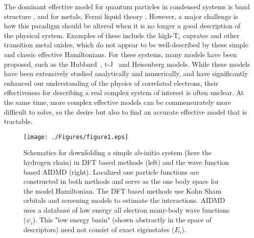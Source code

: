 The dominant effective model for quantum particles in condensed systems is band structure , and for metals, Fermi liquid theory . 
However, a major challenge is how this paradigm should be altered when it is no longer a good description of the physical system.
Examples of these include the high-T$_c$ cuprates and other transition metal oxides, which do not appear to be well-described by these simple and classic effective Hamiltonians. 
For these systems, many models have been proposed, such as the Hubbard~\cite{Hubbard}, t-J~\cite{tJSpalek} and Heisenberg models.
While these models have been extensively studied analytically and numerically, and have significantly enhanced our understanding of the physics of correlated electrons, their effectiveness for describing a real complex system of interest is often unclear. 
At the same time, more complex effective models can be commensurately more difficult to solve, so the desire but also to find an accurate effective model that is tractable. 



\begin{figure}
\centering
\texttt{[image: ./Figures/figure1.eps]}
\caption{Schematics for downfolding a simple ab-initio system (here the hydrogen chain) in DFT based methods (left) and the wave function based AIDMD (right). 
Localized one particle functions are constructed in both methods and serve as the one body space for the model Hamiltonian. 
The DFT based methods use Kohn Sham orbitals and screening models to estimate the interactions. 
AIDMD uses a database of low energy all electron many-body wave functions ($\psi_i$). 
This "low energy basin" (shown abstractly in the space of descriptors) need not consist of exact eigenstates ($E_i$).}
\label{fig:lowenergybasin_schematic}
\end{figure}	



